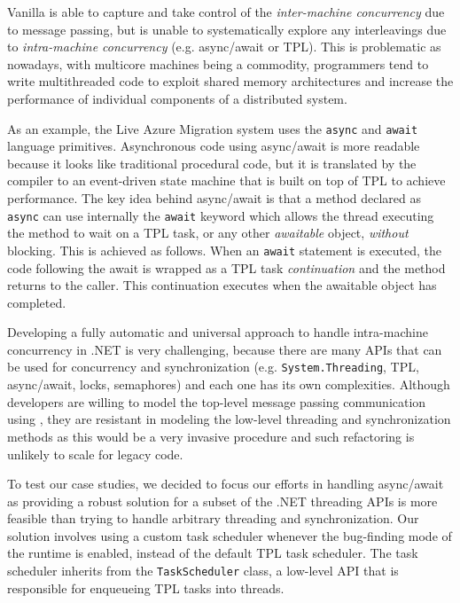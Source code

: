 Vanilla \psharp is able to capture and take control of the \emph{inter-machine concurrency} due to message passing, but is unable to systematically explore any interleavings due to \emph{intra-machine concurrency} (e.g. async/await or TPL). This is problematic as nowadays, with multicore machines being a commodity, programmers tend to write multithreaded code to exploit shared memory architectures and increase the performance of individual components of a distributed system.

As an example, the Live Azure Migration system uses the \texttt{async} and \texttt{await}  language primitives. Asynchronous code using async/await is more readable because it looks like traditional procedural code, but it is translated by the compiler to an event-driven state machine that is built on top of TPL to achieve performance. The key idea behind async/await is that a method declared as \texttt{async} can use internally the \texttt{await} keyword which allows the thread executing the method to wait on a TPL task, or any other \emph{awaitable} object, \emph{without} blocking. This is achieved as follows. When an \texttt{await} statement is executed, the code following the await is wrapped as a TPL task \emph{continuation} and the method returns to the caller. This continuation executes when the awaitable object has completed.

Developing a fully automatic and universal approach to handle intra-machine concurrency in .NET is very challenging, because there are many APIs that can be used for concurrency and synchronization (e.g. \texttt{System.Threading}, TPL, async/await, locks, semaphores) and each one has its own complexities. Although developers are willing to model the top-level message passing communication using \psharp, they are resistant in modeling the low-level threading and synchronization methods as this would be a very invasive procedure and such refactoring is unlikely to scale for legacy code.

To test our case studies, we decided to focus our efforts in handling async/await as providing a robust solution for a subset of the .NET threading APIs is more feasible than trying to handle arbitrary threading and synchronization. Our solution involves using a custom task scheduler whenever the bug-finding mode of the \psharp runtime is enabled, instead of the default TPL task scheduler. The \psharp task scheduler inherits from the \texttt{TaskScheduler} class, a low-level API that is responsible for enqueueing TPL tasks into threads.

